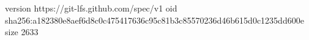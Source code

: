 version https://git-lfs.github.com/spec/v1
oid sha256:a182380e8aef6d8c0c475417636c95c81b3c85570236d46b615d0c1235dd600e
size 2633
